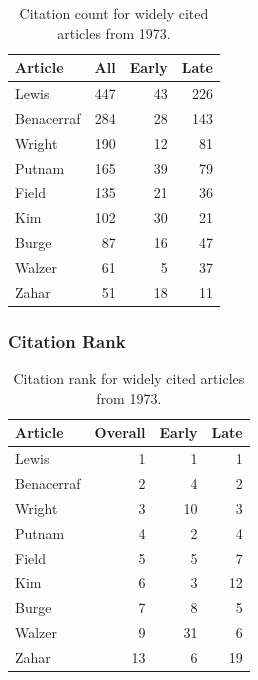 \documentclass[
  10pt,
  letterpaper,
  DIV=11,
  numbers=noendperiod,
  twoside]{scrartcl}
\begin{document}
\begin{longtable}[]{@{}lrrr@{}}

\caption{\label{tbl-citation-count-1973}Citation count for widely cited
articles from 1973.}

\tabularnewline

\toprule\noalign{}
Article & All & Early & Late \\
\midrule\noalign{}
\endhead
\bottomrule\noalign{}
\endlastfoot
Lewis & 447 & 43 & 226 \\
Benacerraf & 284 & 28 & 143 \\
Wright & 190 & 12 & 81 \\
Putnam & 165 & 39 & 79 \\
Field & 135 & 21 & 36 \\
Kim & 102 & 30 & 21 \\
Burge & 87 & 16 & 47 \\
Walzer & 61 & 5 & 37 \\
Zahar & 51 & 18 & 11 \\

\end{longtable}

\subsubsection*{Citation Rank}\label{sec-rank-1973}

\begin{longtable}[]{@{}lrrr@{}}

\caption{\label{tbl-citation-rank-1973}Citation rank for widely cited
articles from 1973.}

\tabularnewline

\toprule\noalign{}
Article & Overall & Early & Late \\
\midrule\noalign{}
\endhead
\bottomrule\noalign{}
\endlastfoot
Lewis & 1 & 1 & 1 \\
Benacerraf & 2 & 4 & 2 \\
Wright & 3 & 10 & 3 \\
Putnam & 4 & 2 & 4 \\
Field & 5 & 5 & 7 \\
Kim & 6 & 3 & 12 \\
Burge & 7 & 8 & 5 \\
Walzer & 9 & 31 & 6 \\
Zahar & 13 & 6 & 19 \\

\end{longtable}
\end{document}
